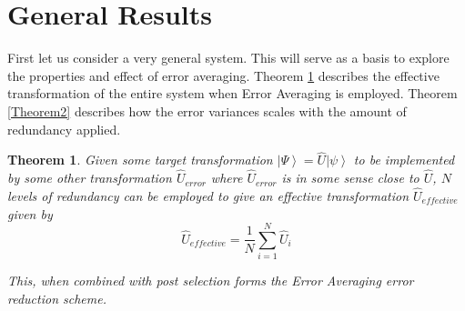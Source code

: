 \documentclass[aps,pra,twocolumn,superscriptaddress,numerical]{revtex4-1}
\newtheorem{thm}{Theorem}
\begin{document}
\section{General Results \label{gen case}}
	First let us consider a very general system. This will serve as a basis to explore the properties and effect of error averaging. Theorem \ref{Theorem1} describes the effective transformation of the entire system when Error Averaging is employed. Theorem \ref{Theorem2} describes how the error variances scales with the amount of redundancy applied. 

	\begin{thm} \label{Theorem1}
		Given some target transformation $\left|\Psi\right\rangle=\hat{U}\left|\psi\right\rangle$ to be implemented by some other transformation $\hat{U}_{error}$ where $\hat{U}_{error}$ is in some sense close to $\hat{U}$, $N$ levels of redundancy can be employed to give an effective transformation $\hat{U}_{effective}$ given by
		\begin{equation}
		\hat{U}_{effective}=\frac{1}{N}\sum_{i=1}^{N}\hat{U}_{i} \label{eq:genTransform}
		\end{equation}
		
		This, when combined with post selection forms the Error Averaging error reduction scheme.
		
	\end{thm}
	
\end{document}
